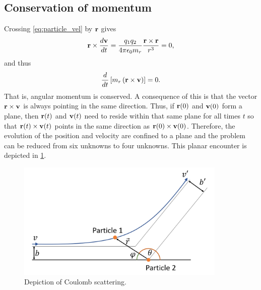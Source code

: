 \documentclass[oneside,a4paper,11pt]{report}
\begin{document}
\subsection{Conservation of momentum}
Crossing \cref{eq:particle_vel} by $\mathbf{r}$ gives
\begin{equation}
    \mathbf{r} \times \frac{d \mathbf{v}}{dt} = \frac{q_1 q_2}{4 \pi \epsilon_0 m_r} \frac{\mathbf{r} \times \mathbf{r}}{r^3} = 0,
\end{equation}
and thus
\begin{equation}
    \frac{d}{dt} \left [ m_r \left ( \mathbf{r} \times \mathbf{v} \right ) \right ] = 0.
\end{equation}
That is, angular momentum is conserved. A consequence of this is that the vector $\mathbf{r} \times \mathbf{v}$ is always pointing in the same direction. Thus, if $\mathbf{r}(0)$ and $\mathbf{v}(0)$ form a plane, then $\mathbf{r}(t)$ and $\mathbf{v}(t)$ need to reside within that same plane for all times $t$ so that $\mathbf{r}(t) \times \mathbf{v}(t)$ points in the same direction as $\mathbf{r}(0) \times \mathbf{v}(0)$. Therefore, the evolution of the position and velocity are confined to a plane and the problem can be reduced from six unknowns to four unknowns. This planar encounter is depicted in \cref{fig:coulomb_scattering}.
\begin{figure}[ht]
    \centering
    \includegraphics[width=10cm]{../../images/coulomb_scattering.png}
    \caption{Depiction of Coulomb scattering.}
    \label{fig:coulomb_scattering}
    \end{figure}

\end{document}
